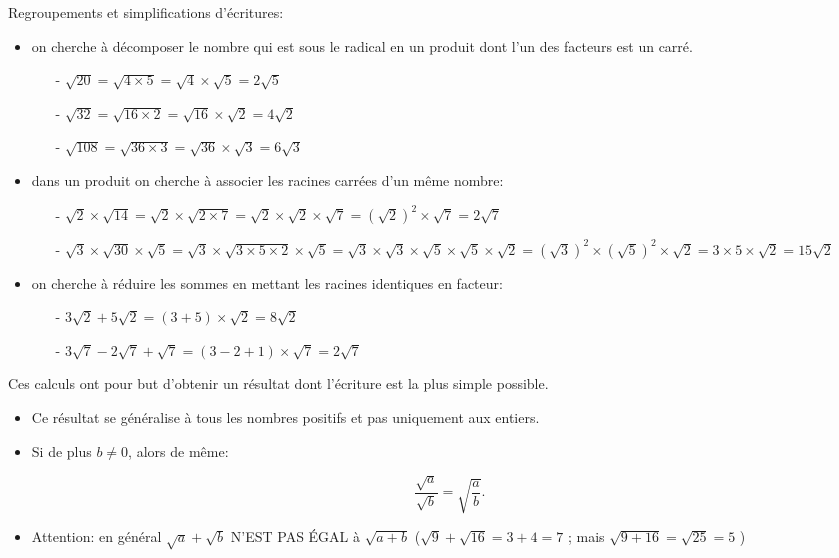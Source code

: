 \begin{methode}{}{}
Regroupements et simplifications d'écritures:

\begin{itemize}
\item  on cherche à décomposer le nombre qui est sous le radical en un produit dont l'un des facteurs est un carré.
\begin{itemize}
\item[-]$\sqrt{20} = \sqrt{4\times 5} = \sqrt{4} \times \sqrt{5} = 2\sqrt{5}$
\item[-]$\sqrt{32} = \sqrt{16\times 2} = \sqrt{16} \times \sqrt{2} = 4\sqrt{2}$
\item[-]$\sqrt{108} = \sqrt{36\times 3} = \sqrt{36} \times \sqrt{3} = 6\sqrt{3}$
\end{itemize}
\item dans un produit on cherche à associer les racines carrées d'un même nombre:
\begin{itemize}
\item[-]$\sqrt{2}\times \sqrt{14} = \sqrt{2}\times \sqrt{2\times 7} = \sqrt{2}\times \sqrt{2}\times \sqrt{7} = \left(\sqrt{2}\right)^2 \times \sqrt{7} = 2 \sqrt{7}$
\item[-]$\sqrt{3}\times \sqrt{30} \times \sqrt{5}= \sqrt{3}\times \sqrt{3\times 5\times 2} \times \sqrt{5}= \sqrt{3}\times \sqrt{3}\times \sqrt{5} \times \sqrt{5}\times \sqrt{2}= \left(\sqrt{3}\right)^2 \times \left(\sqrt{5}\right)^2 \times \sqrt{2} = 3 \times 5 \times \sqrt{2} = 15\sqrt{2}$
\end{itemize}
\item on cherche à réduire les sommes en mettant les racines identiques en facteur:
\begin{itemize}
\item[-]$3\sqrt{2}+5\sqrt{2} = (3+5)\times \sqrt{2} = 8\sqrt{2}$
\item[-]$3\sqrt{7}-2\sqrt{7} +\sqrt{7}= (3-2+1)\times \sqrt{7} = 2\sqrt{7}$
\end{itemize}
\end{itemize}
Ces calculs ont pour but d'obtenir un résultat dont l'écriture est la plus simple possible.
\end{methode}



\begin{rem}{}{}
\begin{itemize}
\item Ce résultat se généralise à tous les nombres positifs et pas uniquement aux entiers.
\item Si de plus $b \ne 0$, alors de même: 

\vspace{-7mm}
\[ \frac{\sqrt{a}}{\sqrt{b}}=\sqrt{\frac{a}{b}}. \]
\item Attention: en général $\sqrt{a} + \sqrt{b}$ N'EST PAS ÉGAL à $\sqrt{a + b}$
\quad($\sqrt{9} + \sqrt{16}= 3 + 4 = 7$ ; mais $\sqrt{9 + 16} = \sqrt{25} = 5$ )
\end{itemize}
\end{rem}


